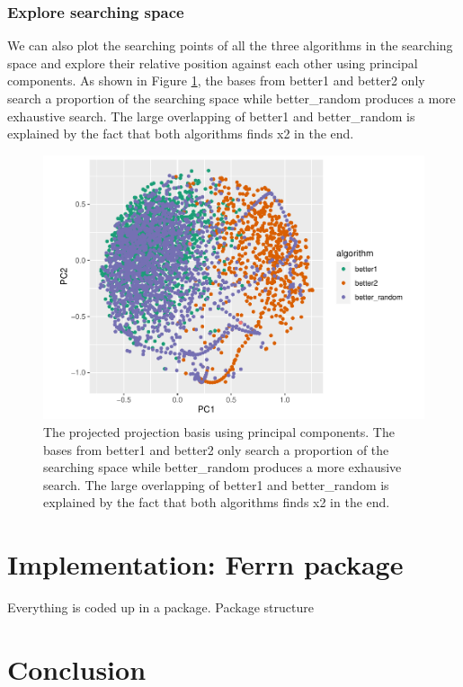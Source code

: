 \documentclass[12pt]{article}
\begin{document}
\hypertarget{explore-searching-space}{%
\subsubsection{Explore searching space}\label{explore-searching-space}}

We can also plot the searching points of all the three algorithms in the
searching space and explore their relative position against each other
using principal components. As shown in Figure
\ref{1d-2var-explore-proj-pca}, the bases from better1 and better2 only
search a proportion of the searching space while better\_random produces
a more exhaustive search. The large overlapping of better1 and
better\_random is explained by the fact that both algorithms finds x2 in
the end.

\begin{figure}
\centering
\includegraphics{paper_files/figure-latex/1d-2var-explore-proj-pca-1.pdf}
\caption{\label{1d-2var-explore-proj-pca} The projected projection basis
using principal components. The bases from better1 and better2 only
search a proportion of the searching space while better\_random produces
a more exhausive search. The large overlapping of better1 and
better\_random is explained by the fact that both algorithms finds x2 in
the end.}
\end{figure}

\hypertarget{implementation}{%
\section{Implementation: Ferrn package}\label{implementation}}

Everything is coded up in a package. Package structure

\hypertarget{conclusion}{%
\section{Conclusion}\label{conclusion}}

\clearpage



\end{document}

